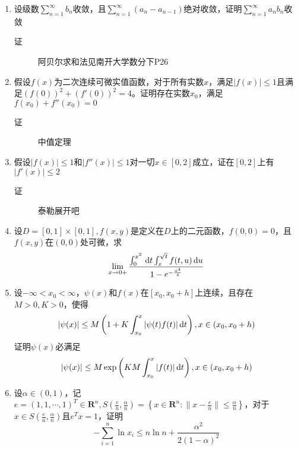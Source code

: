 \begin{enumerate}
\begin{description}
\end{description}

\item 设级数$\sum_{n=1}^{\infty}b_n$收敛，且$\sum_{n=1}^{\infty}(a_n-a_{n-1})$绝对收敛，证明$\sum_{n=1}^{\infty}a_nb_n$收敛
\begin{description}
\item[证] 阿贝尔求和法见南开大学数分下P26
\end{description}

\item 假设$f(x)$为二次连续可微实值函数，对于所有实数$x$，满足$|f(x)|\leq 1$且满足$(f(0))^2+(f'(0))^2=4$。证明存在实数$x_0$，满足$f(x_0)+f''(x_0)=0$
\begin{description}
\item[证] 中值定理
\end{description}

\item 假设$|f(x)|\leq 1$和$|f''(x)|\leq 1$对一切$x\in [0,2]$成立，证在$[0,2]$上有$|f'(x)|\leq 2$
\begin{description}
\item[证] 泰勒展开吧
\end{description}

\item 设$D=[0,1]\times[0,1],f(x,y)$是定义在$D$上的二元函数，$f(0,0)=0$，且$f(x,y)$在$(0,0)$处可微，求
\[
\lim_{x \to 0+}\frac{\int_0^{x^2}\,\mathrm{d} t\int_x^{\sqrt{t}}f(t,u)\,\mathrm{d} u}{1-e^{-\frac{x^4}{4}}}
\]

\item 设$-\infty<x_0<\infty$，$\psi(x)$和$f(x)$在$[x_0,x_0+h]$上连续，且存在$M>0,K>0$，使得
\[
|\psi(x)|\leq M\left(1+K\int_{x_0}^x|\psi(t)f(t)|\,\mathrm{d} t\right),x\in(x_0,x_0+h)
\]
证明$\psi(x)$必满足
\[
|\psi(x)|\leq M\exp\left(KM\int_{x_0}^x|f(t)|\,\mathrm{d} t\right),x\in(x_0,x_0+h)
\]


\item 设$\alpha \in(0,1)$，记$e=(1,1,\cdots,1)^T\in\mathbf{R}^n,S(\frac{e}{n},\frac{\alpha}{n})=\left\{ x\in\mathbf{R}^n:\|x-\frac{e}{n}\|\leq \frac{\alpha}{n} \right\}$，对于$x\in S (\frac{e}{n},\frac{\alpha}{n})$且$e^Tx=1$，证明
\[
-\sum_{i=1}^n\ln x_i\leq n\ln n+\frac{\alpha^2}{2(1-\alpha)^2}
\]




















\end{enumerate}